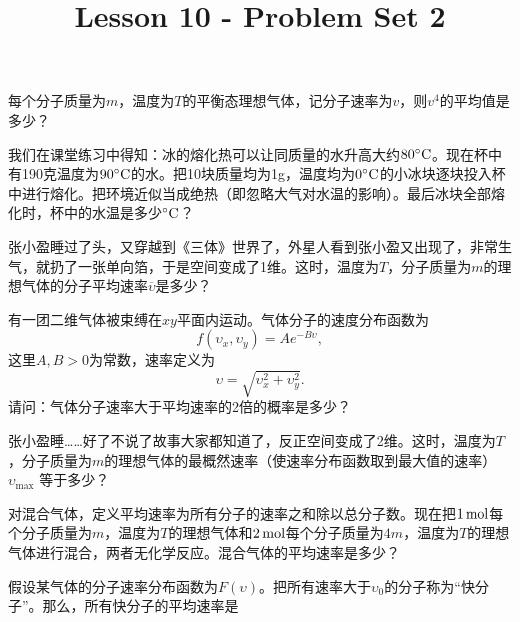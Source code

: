 \documentclass[CJK]{beamer}
\title{Lesson 10 - Problem Set 2}
\author{}
\date{}
\begin{document}

\begin{frame}
  \bchL
每个分子质量为$m$，温度为$T$的平衡态理想气体，记分子速率为$v$，则$v^4$的平均值是多少？  
\echL
\end{frame}



\begin{frame}
  \bchL
  我们在课堂练习中得知：冰的熔化热可以让同质量的水升高大约$80^\circ \mathrm{C}$。现在杯中有190克温度为$90^\circ \mathrm{C}$的水。把10块质量均为1g，温度均为$0^\circ \mathrm{C}$的小冰块逐块投入杯中进行熔化。把环境近似当成绝热（即忽略大气对水温的影响）。最后冰块全部熔化时，杯中的水温是多少$^\circ \mathrm{C}$？
  \echL
\end{frame}


\begin{frame}
  \bchL
张小盈睡过了头，又穿越到《三体》世界了，外星人看到张小盈又出现了，非常生气，就扔了一张单向箔，于是空间变成了1维。这时，温度为$T$，分子质量为$m$的理想气体的分子平均速率$\overline{\upsilon}$是多少？
\echL
\end{frame}

\begin{frame}
  \bchL
有一团二维气体被束缚在$xy$平面内运动。气体分子的速度分布函数为
$$f(\upsilon_x, \upsilon_y) = A e^{-B\upsilon},$$
这里$A,B>0$为常数，速率定义为
$$\upsilon =\sqrt{\upsilon_x^2+\upsilon_y^2}.$$
请问：气体分子速率大于平均速率的2倍的概率是多少？
\echL
\end{frame}


\begin{frame}
  \bchL
张小盈睡……好了不说了故事大家都知道了，反正空间变成了2维。这时，温度为$T$，分子质量为$m$的理想气体的最概然速率（使速率分布函数取到最大值的速率） $\upsilon_{\max}$ 等于多少？
  \echL
\end{frame}

\begin{frame}
  \bchL
  对混合气体，定义平均速率为所有分子的速率之和除以总分子数。现在把$1\,\mathrm{mol}$每个分子质量为$m$，温度为$T$的理想气体和$2\,\mathrm{mol}$每个分子质量为$4m$，温度为$T$的理想气体进行混合，两者无化学反应。混合气体的平均速率是多少？
  
  \echL
\end{frame}

\begin{frame}
  \bchL
假设某气体的分子速率分布函数为$F(\upsilon)$。把所有速率大于$\upsilon_0$的分子称为“快分子”。那么，所有快分子的平均速率是  
  \echL
\end{frame}
\end{document}
